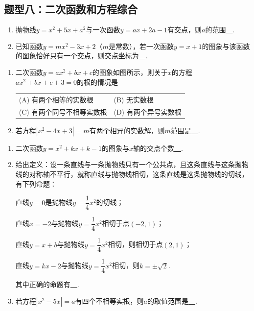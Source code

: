 \documentclass[10pt]{ctexart}
\newcommand{\abs}[1]{\left| #1 \right|}
\newcommand{\twoch}[4]{
\renewcommand\arraystretch{1.4}
\begin{tabularx}{\linewidth}{XX}
\setlength\tabcolsep{0pt}
(A) #1 & (B) #2 \\
(C) #3 & (D) #4
\end{tabularx}
\unskip \unskip}
\begin{document}
\subsection{题型八：二次函数和方程综合}
\begin{dkyi}{}{}
  \begin{enumerate}[(1)]
  \item 抛物线$y=x^2+5x+a^2$与一次函数$y=ax+2a-1$有交点，则$a$的范围\underline{~\hspace{1cm}~}.
  \item 已知函数$y=mx^2-3x+2$（$m$是常数），若一次函数$y=x+1$的图象与该函数的图象恰好只有一个交点，则交点坐标为\underline{~\hspace{1cm}~}.
  \end{enumerate}
\end{dkyi}
\begin{dkyi}{}{}
  \begin{enumerate}[(1)]
  \item 二次函数$y=ax^2+bx+c$的图象如图所示，则关于$x$的方程$ax^2+bx+c+3=0$的根的情况是
  
  \twoch{有两个相等的实数根}{无实数根}{有两个同号不相等实数根}{有两个异号实数根}
  \item 若方程$\abs{x^2-4x+3}=m$有两个相异的实数解，则$m$范围是\underline{~\hspace{1cm}~}.
  \end{enumerate}
\end{dkyi}
\begin{jply}{}{}
   \begin{enumerate}[(1)]
   \item 二次函数$y=x^2+kx+k-1$的图象与$x$轴的交点个数\underline{~\hspace{1cm}~}.
   \item 给出定义：设一条直线与一条抛物线只有一个公共点，且这条直线与这条抛物线的对称轴不平行，就称直线与抛物线相切，这条直线是这条抛物线的切线，有下列命题：
   
   直线$y=0$是抛物线$y=\dfrac{1}{4}x^2$的切线；
   
   直线$x=-2$与抛物线$y=\dfrac{1}{4}x^2$相切于点$(-2,1)$；
   
   直线$y=x+b$与抛物线$y=\dfrac{1}{4}x^2$相切，则相切于点$(2,1)$；
   
   直线$y=kx-2$与抛物线$y=\dfrac{1}{4}x^2$相切，则$k=\pm \sqrt{2}$.
   
   其中正确的命题有\underline{~\hspace{1cm}~}.
   \item 若方程$\abs{x^2-5x}=a$有四个不相等实根，则$a$的取值范围是\underline{~\hspace{1cm}~}.
   \end{enumerate}
\end{jply}
\end{document}
